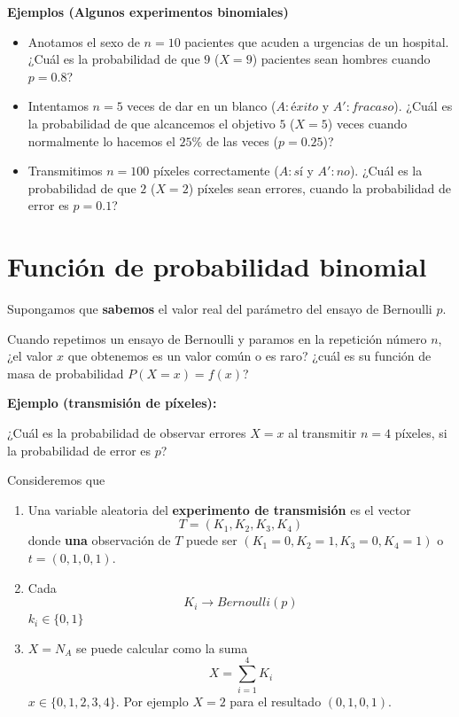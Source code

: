\documentclass[
]{book}
\begin{document}
\textbf{Ejemplos (Algunos experimentos binomiales)}

\begin{itemize}
\item
  Anotamos el sexo de \(n=10\) pacientes que acuden a urgencias de un hospital. ¿Cuál es la probabilidad de que \(9\) (\(X=9\)) pacientes sean hombres cuando \(p=0.8\)?
\item
  Intentamos \(n=5\) veces de dar en un blanco (\(A:éxito\) y \(A':fracaso\)). ¿Cuál es la probabilidad de que alcancemos el objetivo \(5\) (\(X=5\)) veces cuando normalmente lo hacemos el \(25\%\) de las veces (\(p=0.25\))?
\item
  Transmitimos \(n=100\) píxeles correctamente (\(A:sí\) y \(A':no\)). ¿Cuál es la probabilidad de que \(2\) (\(X=2\)) píxeles sean errores, cuando la probabilidad de error es \(p=0.1\)?
\end{itemize}

\hypertarget{funciuxf3n-de-probabilidad-binomial}{%
\section{Función de probabilidad binomial}\label{funciuxf3n-de-probabilidad-binomial}}

Supongamos que \textbf{sabemos} el valor real del parámetro del ensayo de Bernoulli \(p\).

Cuando repetimos un ensayo de Bernoulli y paramos en la repetición número \(n\), ¿el valor \(x\) que obtenemos es un valor común o es raro? ¿cuál es su función de masa de probabilidad \(P(X=x)=f(x)\)?

\textbf{Ejemplo (transmisión de píxeles):}

¿Cuál es la probabilidad de observar errores \(X=x\) al transmitir \(n=4\) píxeles, si la probabilidad de error es \(p\)?

Consideremos que

\begin{enumerate}
\def\labelenumi{\arabic{enumi})}
\item
  Una variable aleatoria del \textbf{experimento de transmisión} es el vector \[T=(K_1, K_2, K_3, K_4)\] donde \textbf{una} observación de \(T\) puede ser \((K_1=0, K_2=1, K_3=0, K_4= 1)\) o \(t=(0, 1, 0, 1)\).
\item
  Cada \[K_i \rightarrow Bernoulli(p)\] \(k_i \in \{0, 1\}\)
\item
  \(X=N_A\) se puede calcular como la suma \[X=\sum_{i=1}^4 K_i\] \(x\in \{0,1,2,3,4\}\). Por ejemplo \(X=2\) para el resultado \((0, 1, 0, 1)\).
\end{enumerate}
\end{document}
